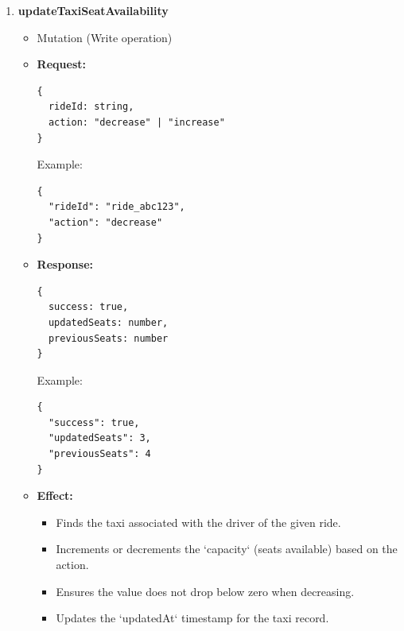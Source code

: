 \documentclass[a4paper,12pt]{article}
\begin{document}
\begin{enumerate}
\begin{itemize}
      \item \textbf{Response:}
      \begin{verbatim}
{
  _id: string,
  driverId: string,
  licensePlate: string,
  model: string,
  capacity: number,
  image: string | null
} | null
      \end{verbatim}
      Example:
      \begin{verbatim}
{
  "_id": "taxi456",
  "driverId": "driver789",
  "licensePlate": "XYZ789",
  "model": "Toyota Quantum",
  "capacity": 14,
  "image": "https://example.com/taxi.jpg"
}
      \end{verbatim}

      \item \textbf{Effect:}
      \begin{itemize}
        \item Given a driver's user ID, this query retrieves the taxi assigned to that driver.
        \item If no driver profile is found for the given user ID, it returns \texttt{null}.
        \item If a driver exists but no taxi is assigned, it also returns \texttt{null}.
      \end{itemize}
    \end{itemize}

\item \textbf{updateTaxiSeatAvailability}
  \begin{itemize}
    \item Mutation (Write operation)
    \item \textbf{Request:}
    \begin{verbatim}
{
  rideId: string,
  action: "decrease" | "increase"
}
    \end{verbatim}
    Example:
    \begin{verbatim}
{
  "rideId": "ride_abc123",
  "action": "decrease"
}
    \end{verbatim}
    \item \textbf{Response:}
    \begin{verbatim}
{
  success: true,
  updatedSeats: number,
  previousSeats: number
}
    \end{verbatim}
    Example:
    \begin{verbatim}
{
  "success": true,
  "updatedSeats": 3,
  "previousSeats": 4
}
    \end{verbatim}
    \item \textbf{Effect:}
    \begin{itemize}
      \item Finds the taxi associated with the driver of the given ride.
      \item Increments or decrements the `capacity` (seats available) based on the action.
      \item Ensures the value does not drop below zero when decreasing.
      \item Updates the `updatedAt` timestamp for the taxi record.
    \end{itemize}
  \end{itemize}


\end{enumerate}
\end{document}
